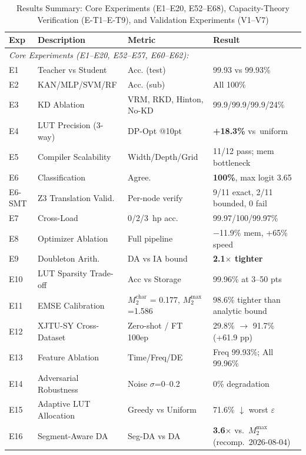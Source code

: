 \documentclass[journal,onecolumn]{IEEEtran}
\renewcommand{\tabcolsep}{4pt}
\renewcommand{\arraystretch}{1.12}
\begin{document}
\begin{table}[tb]
\centering
\caption{Results Summary: Core Experiments (E1--E20, E52--E68), Capacity-Theory Verification (E-T1--E-T9), and Validation Experiments (V1--V7)}
\label{tab:summary}
\scriptsize
\setlength{\tabcolsep}{4pt}
\renewcommand{\arraystretch}{0.95}
\begin{tabular}{@{}p{0.7cm}p{4.6cm}p{3.6cm}p{4.9cm}@{}}
\toprule
\textbf{Exp} & \textbf{Description} & \textbf{Metric} & \textbf{Result} \\
\midrule
\multicolumn{4}{l}{\textit{Core Experiments (E1--E20, E52--E57, E60--E62):}} \\
E1 & Teacher vs Student    & Acc. (test) & 99.93 vs 99.93\% \\
E2 & KAN/MLP/SVM/RF        & Acc. (sub)  & All 100\% \\
E3 & KD Ablation           & VRM, RKD, Hinton, No-KD & 99.9/99.9/99.9/24\% \\
E4 & LUT Precision (3-way) & DP-Opt @10pt & \textbf{+18.3\%} vs~uniform \\
E5 & Compiler Scalability  & Width/Depth/Grid & 11/12 pass; mem bottleneck \\
E6 & Classification        & Agree. & \textbf{100\%}, max logit 3.65 \\
E6-SMT & Z3 Translation Valid. & Per-node verify & 9/11 exact, 2/11 bounded, 0 fail \\
E7 & Cross-Load            & 0/2/3~hp acc. & 99.97/100/99.97\% \\
E8 & Optimizer Ablation    & Full pipeline & $-$11.9\% mem, +65\% speed \\
E9 & Doubleton Arith.      & DA vs IA bound & \textbf{2.1$\times$ tighter} \\
E10& LUT Sparsity Trade-off& Acc vs Storage & 99.96\% at 3--50 pts \\
E11& EMSE Calibration      & $M_2^{\text{char}}$ = 0.177, $M_2^{\max}$=1.586 & 98.6\% tighter than analytic bound \\
E12& XJTU-SY Cross-Dataset & Zero-shot / FT 100ep & 29.8\% $\to$ 91.7\% (+61.9 pp) \\
E13& Feature Ablation      & Time/Freq/DE    & Freq 99.93\%; All 99.96\% \\
E14& Adversarial Robustness& Noise $\sigma$=0--0.2 & 0\% degradation \\
E15& Adaptive LUT Allocation & Greedy vs Uniform  & 71.6\% $\downarrow$ worst $\varepsilon$ \\
E16& Segment-Aware DA       & Seg-DA vs DA       & \textbf{3.6$\times$} vs.\ $M_2^{\max}$ (recomp.\ 2026-08-04) \\

\end{tabular}
\end{table}
\end{document}
